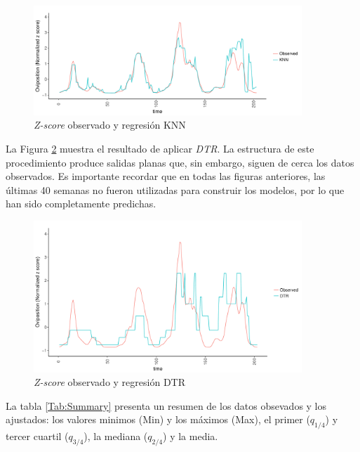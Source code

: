     \begin{figure}[hbt]
    \centering%
    \includegraphics[width=0.9\textwidth]{images/knn}%
    \caption{\textit{Z-score} observado y regresión KNN}\label{fig:knn}
    \end{figure}


  \par La Figura \ref{fig:dtr} muestra el resultado de aplicar \textit{DTR}.
    La estructura de este procedimiento produce salidas
    planas que, sin embargo, siguen de cerca los datos observados.
    Es importante recordar que en todas las figuras anteriores, las últimas
    40 semanas no fueron utilizadas para construir los modelos, por lo que
    han sido completamente predichas.

    \begin{figure}[hbt]
    \centering%
    \includegraphics[width=0.9\textwidth]{images/dtr}%
    \caption{\textit{Z-score} observado y regresión DTR}\label{fig:dtr}
    \end{figure}



  \par La tabla \ref{Tab:Summary} presenta un resumen de los datos obsevados
    y los ajustados: los valores minimos (Min) y los máximos (Max), el
    primer ($q_{1/4}$) y tercer cuartil ($q_{3/4}$), la mediana ($q_{2/4}$)
    y la media.

